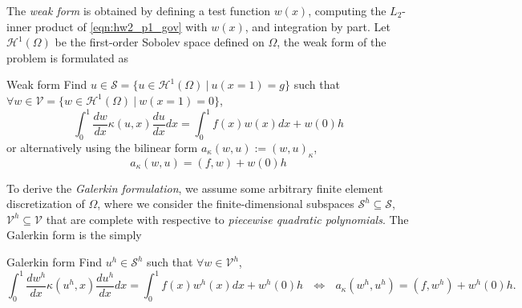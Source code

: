 The \emph{weak form} is obtained by defining a test function $w(x)$, computing the $L_2$-inner product of \cref{eqn:hw2_p1_gov} with $w(x)$, and integration by part. 
Let $\mathcal{H}^1(\Omega)$ be the first-order Sobolev space defined on $\Omega$, the weak form of the problem is formulated as 
\begin{codenv}{Weak form}
Find $u \in \mathcal{S} = \{u \in \mathcal{H}^1(\Omega) ~|~ u(x=1) = g\}$ such that $\forall w \in \mathcal{V} = \{w \in \mathcal{H}^1(\Omega) ~|~ w(x=1) = 0\}$, 
\begin{equation}
    \int_0^1 \frac{dw}{dx} \kappa(u, x) \frac{du}{dx} dx = \int_0^1 f(x) w(x) dx + w(0)h
\end{equation}
or alternatively using the bilinear form $a_\kappa(w, u) := {(w, u)}_\kappa$,
\begin{equation}
    a_\kappa (w, u) = (f, w) + w(0)h
\end{equation}
\end{codenv}

To derive the \emph{Galerkin formulation}, we assume some arbitrary finite element discretization of $\Omega$, where we consider the finite-dimensional subspaces $\mathcal{S}^h \subseteq \mathcal{S}$, $\mathcal{V}^h \subseteq \mathcal{V}$ that are complete with respective to \emph{piecewise quadratic polynomials}. 
The Galerkin form is the simply 
\begin{codenv}{Galerkin form}
    Find $u^h \in \mathcal{S}^h$ such that $\forall w \in \mathcal{V}^h$, 
    \begin{equation}
        \int_0^1 \frac{dw^h}{dx} \kappa(u^h, x) \frac{du^h}{dx} dx = \int_0^1 f(x) w^h(x) dx + w^h(0) h ~~~ \Leftrightarrow ~~~ a_\kappa (w^h, u^h) = (f, w^h) + w^h(0)h.
    \end{equation}
\end{codenv}

